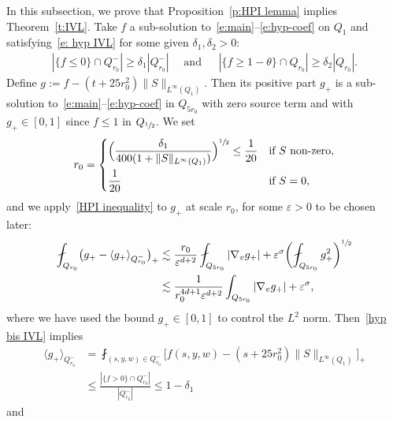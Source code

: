 \documentclass[11pt]{article}
\numberwithin{equation}{section}\let\oldbigcup\bigcup
\theoremstyle{definition}
\theoremstyle{remark}
\let\var\varepsilon
\begin{document}
In this subsection, we prove that Proposition~\ref{p:HPI lemma}
implies Theorem~\ref{t:IVL}. Take $f$ a sub-solution
to~\eqref{e:main}--\eqref{e:hyp-coef} on $Q_1$ and
satisfying~\eqref{e: hyp IVL} for some given
$\delta_1,\delta_2>0$:\vspace*{-3pt}
\begin{align}
\label{hyp bis IVL}
|\{f\leq 0\}\cap Q_{r_0}^{-}| \geq \delta_1 |Q_{r_0}^{-}|
\quad \text{ and }\ \quad
|\{f\geq 1-\theta\} \cap Q_{r_0}| \geq \delta_2 |Q_{r_0}|.
\end{align}
Define $g:=f-(t+25r_0^2) \|S\|_{L^\infty(Q_1)}$. Then its
positive part $g_+$ is a sub-solution
to~\eqref{e:main}--\eqref{e:hyp-coef} in $Q_{5r_0}$ with zero
source term and with $g_+ \in [0,1]$ since $f\le 1$ in
$Q_{\sfrac{1}{2}}$. We set\vspace*{-3pt}
\[
r_0 = \begin{dcases}
\Bigl(\dfrac{\delta_1}{400
(1+\|S\|_{L^\infty(Q_1)})}\Bigr)^{\sfrac12} \leq
\dfrac{1}{20}&\text{if $S$ non-zero},\\
\dfrac{1}{20}&\text{if $S=0$},
\end{dcases}
\]
and we apply~\eqref{HPI inequality} to $g_+$ at scale $r_0$, for
some $\var>0$ to be chosen later:\vspace*{-3pt}
\begin{equation}\label{Poinc in proof}
\begin{aligned}
\fint_{Q_{r_0}} \bigl(g_+-\langle
g_+\rangle_{Q_{r_0}^{-}}\bigr)_{+}
& \lesssim
\frac{r_0}{\varepsilon^{d+2}} \fint_{Q_{5r_0}} |\nabla_v g_+|
+ \var^\sigma \biggl( \fint_{Q_{5r_0}} g_+^2 \biggr)^{\sfrac12}\\
& \lesssim
\frac{1}{r_0^{4d+1} \varepsilon^{d+2}} \int_{Q_{5r_0}} |\nabla_v g_+|
+ \var^\sigma,
\end{aligned}
\end{equation}
where we have used the bound $g_+ \in [0,1]$ to control the $L^2$
norm. Then~\eqref{hyp bis IVL} implies\vspace*{-3pt}
\begin{equation}
\begin{aligned}
\label{estim averag}
\langle g_+\rangle_{Q_{r_0}^{-}} &= \fint_{(s,y,w) \in
Q_{r_0}^-} \big[f(s,y,w) - (s+25r_0^2) \| S \|_{L^\infty(Q_1)}\big]_+\\
&\leq \frac{\left|{\{f>0\}\cap Q_{r_0}^-}\right|}{|Q^{-}_{r_0}|}
\leq 1-\delta_1
\end{aligned}
\end{equation}
and\vspace*{-3pt}
\end{document}
